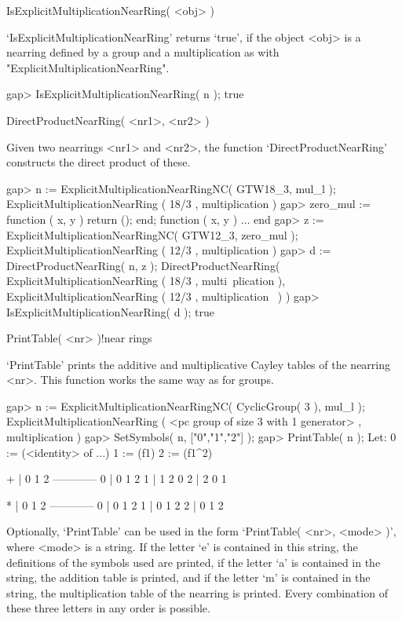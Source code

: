 \>IsExplicitMultiplicationNearRing( <obj> )

`IsExplicitMultiplicationNearRing' returns `true', if the object <obj> is
a nearring defined by a group and a multiplication as with
"ExplicitMultiplicationNearRing".

\beginexample
    gap> IsExplicitMultiplicationNearRing( n );
    true
\endexample



\>DirectProductNearRing( <nr1>, <nr2> )

Given two nearrings <nr1> and <nr2>, the function `DirectProductNearRing'
constructs the direct product of these.

\beginexample
    gap> n := ExplicitMultiplicationNearRingNC( GTW18_3, mul_l );
    ExplicitMultiplicationNearRing ( 18/3 , multiplication )
    gap> zero_mul := function ( x, y ) return (); end;
    function ( x, y ) ... end
    gap> z := ExplicitMultiplicationNearRingNC( GTW12_3, zero_mul );
    ExplicitMultiplicationNearRing ( 12/3 , multiplication )
    gap> d := DirectProductNearRing( n, z );
    DirectProductNearRing( ExplicitMultiplicationNearRing ( 18/3 , multi\
    plication ), ExplicitMultiplicationNearRing ( 12/3 , multiplication \
    ) )
    gap> IsExplicitMultiplicationNearRing( d );
    true
\endexample



\>PrintTable( <nr> )!{near rings}

`PrintTable' prints the additive and multiplicative Cayley tables of the 
nearring <nr>. This function works the same way as for groups.

\beginexample
    gap> n := ExplicitMultiplicationNearRingNC( CyclicGroup( 3 ), mul_l );
    ExplicitMultiplicationNearRing ( <pc group of size 3 with 
    1 generator> , multiplication )
    gap> SetSymbols( n, ["0","1","2"] );
    gap> PrintTable( n );               
    Let:
    0 := (<identity> of ...)
    1 := (f1)
    2 := (f1^2)

      +  | 0  1  2  
      ------------
      0  | 0  1  2  
      1  | 1  2  0  
      2  | 2  0  1  

      *  | 0  1  2  
      ------------
      0  | 0  1  2  
      1  | 0  1  2  
      2  | 0  1  2  
\endexample

Optionally, `PrintTable' can be used in the form `PrintTable( <nr>, <mode> )', 
where <mode> is a string. If the letter `e' is contained in this string, the 
definitions of the symbols used are printed, if the letter `a' is contained 
in the string, the addition table is printed, and if the letter `m' is contained
in the string, the multiplication table of the nearring is printed. Every 
combination of these three letters in any order is possible.

